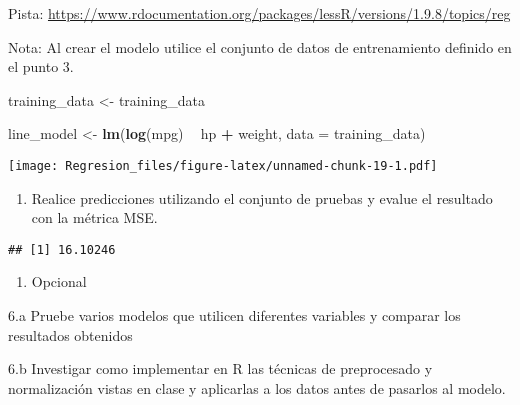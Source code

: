 \documentclass[]{article}
\newenvironment{Shaded}{\begin{snugshade}}{\end{snugshade}}
\newcommand{\DataTypeTok}[1]{\textcolor[rgb]{0.13,0.29,0.53}{#1}}
\newcommand{\KeywordTok}[1]{\textcolor[rgb]{0.13,0.29,0.53}{\textbf{#1}}}
\newcommand{\NormalTok}[1]{#1}
\newcommand{\OperatorTok}[1]{\textcolor[rgb]{0.81,0.36,0.00}{\textbf{#1}}}
\newcommand{\StringTok}[1]{\textcolor[rgb]{0.31,0.60,0.02}{#1}}
\providecommand{\tightlist}{%
  \setlength{\itemsep}{0pt}\setlength{\parskip}{0pt}}
\begin{document}
Pista:
\url{https://www.rdocumentation.org/packages/lessR/versions/1.9.8/topics/reg}

Nota: Al crear el modelo utilice el conjunto de datos de entrenamiento
definido en el punto 3.

\begin{Shaded}
\begin{Highlighting}[]
\NormalTok{training_data <-}\StringTok{ }\NormalTok{training_data}

\NormalTok{line_model <-}\StringTok{ }\KeywordTok{lm}\NormalTok{(}\KeywordTok{log}\NormalTok{(mpg) }\OperatorTok{~}\StringTok{ }\NormalTok{hp }\OperatorTok{+}\StringTok{ }\NormalTok{weight, }\DataTypeTok{data =}\NormalTok{ training_data)}
\end{Highlighting}
\end{Shaded}

\begin{Shaded}
\end{Shaded}

\texttt{[image: Regresion\_files/figure-latex/unnamed-chunk-19-1.pdf]}

\begin{enumerate}
\def\labelenumi{\arabic{enumi}.}
\setcounter{enumi}{4}
\tightlist
\item
  Realice predicciones utilizando el conjunto de pruebas y evalue el
  resultado con la métrica MSE.
\end{enumerate}

\begin{Shaded}
\end{Shaded}

\begin{verbatim}
## [1] 16.10246
\end{verbatim}

\begin{enumerate}
\def\labelenumi{\arabic{enumi}.}
\setcounter{enumi}{5}
\tightlist
\item
  Opcional
\end{enumerate}

6.a Pruebe varios modelos que utilicen diferentes variables y comparar
los resultados obtenidos

6.b Investigar como implementar en R las técnicas de preprocesado y
normalización vistas en clase y aplicarlas a los datos antes de pasarlos
al modelo.
\end{document}
